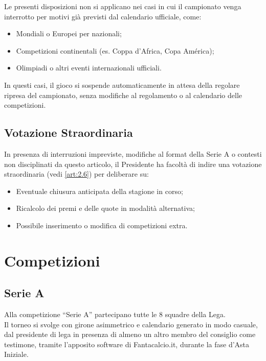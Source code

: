Le presenti disposizioni non si applicano nei casi in cui il campionato venga interrotto per motivi già previsti dal calendario ufficiale, come:
\begin{itemize}
\item Mondiali o Europei per nazionali;
\item Competizioni continentali (es. Coppa d'Africa, Copa América);
\item Olimpiadi o altri eventi internazionali ufficiali.
\end{itemize}

In questi casi, il gioco si sospende automaticamente in attesa della regolare ripresa del campionato, senza modifiche al regolamento o al calendario delle competizioni.

\section{Votazione Straordinaria}
\label{art:8.4}

In presenza di interruzioni impreviste, modifiche al format della Serie A o contesti non disciplinati da questo articolo, il Presidente ha facoltà di indire una votazione straordinaria (vedi \ref{art:2.6}) per deliberare su:
\begin{itemize}
\item Eventuale chiusura anticipata della stagione in corso;
\item Ricalcolo dei premi e delle quote in modalità alternativa;
\item Possibile inserimento o modifica di competizioni extra.
\end{itemize}


\chapter{Competizioni}
\label{cap:competizioni}

\section{Serie A}
\label{art:9.1}

Alla competizione “Serie A” partecipano tutte le 8 squadre della Lega.\\
Il torneo si svolge con girone asimmetrico e calendario generato in modo casuale, dal presidente di lega in presenza di almeno un altro membro del consiglio come testimone, tramite l'apposito software di Fantacalcio.it, durante la fase d'Asta Iniziale.

